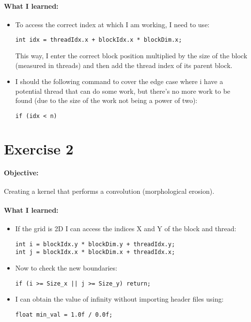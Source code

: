 \documentclass{article}
\begin{document}
\paragraph{What I learned:}
\begin{itemize}
  \item To access the correct index at which I am working, I need to use:
  \begin{lstlisting}[caption=Index access]
int idx = threadIdx.x + blockIdx.x * blockDim.x;
  \end{lstlisting}
  This way, I enter the correct block position multiplied by the size of the block (measured in threads) and then add the thread index of its parent block.
  \item  I should the following command to cover the edge case where i have a potential thread that can do some work, but there's no more work to be found (due to the size of the work not being a power of two):
  \begin{lstlisting}[caption=Index edge-case]
if (idx < n)
  \end{lstlisting}
\end{itemize}

\newpage
\section{Exercise 2}
\paragraph{Objective:}
Creating a kernel that performs a convolution (morphological erosion).
\paragraph{What I learned:}
  
\begin{itemize}
  \item If the grid is 2D I can access the indices X and Y of the block and thread:
    \begin{lstlisting}[caption=Index access]
int i = blockIdx.y * blockDim.y + threadIdx.y;
int j = blockIdx.x * blockDim.x + threadIdx.x;
    \end{lstlisting}
  \item Now to check the new boundaries:
    \begin{lstlisting}[caption=Index edge-case]
if (i >= Size_x || j >= Size_y) return;
    \end{lstlisting}
    \item I can obtain the value of infinity without importing header files using:
    \begin{lstlisting}[caption=Infinity]
float min_val = 1.0f / 0.0f;
    \end{lstlisting}
\end{itemize}
\end{document}
